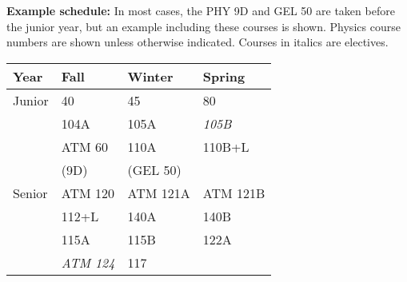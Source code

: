\documentclass[12pt]{article}
\begin{document}
\noindent
{\bf Example schedule:} In most cases, the PHY 9D and GEL 50 are taken
before the junior year, but an example including these courses is
shown.  Physics course numbers are shown unless otherwise indicated.
Courses in italics are electives.
\begin{center}
\begin{tabular}{|l|l|l|l|}
\hline
Year      & Fall    & Winter & Spring \\
\hline
Junior    & 40         & 45           & 80 \\
          & 104A       & 105A         & {\it 105B} \\
          & ATM 60     & 110A         & 110B+L \\
          & (9D)       & (GEL 50)     & \\
\hline
Senior   & ATM 120       & ATM 121A   & ATM 121B \\
         & 112+L         & 140A       & 140B \\
         & 115A          & 115B       & 122A \\
         & {\it ATM 124} & 117       &  \\
\hline
\end{tabular}
\end{center}
\end{document}
